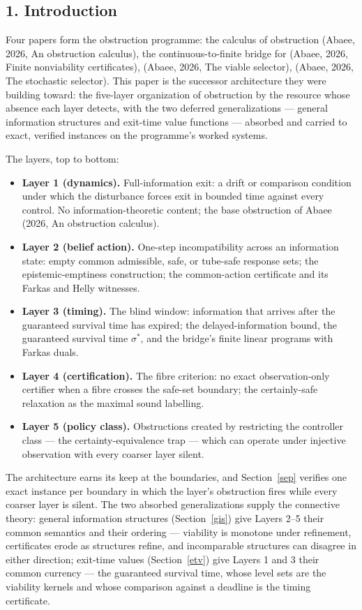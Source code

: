 \documentclass[10pt,twocolumn]{article}
\theoremstyle{definition}
\providecommand{\tightlist}{\setlength{\itemsep}{0pt}\setlength{\parskip}{0pt}}
\begin{document}
\subsection{1. Introduction}\label{introduction}

Four papers form the obstruction programme: the calculus of obstruction
(Abaee, 2026, An obstruction calculus), the continuous-to-finite bridge for
(Abaee, 2026, Finite nonviability certificates), (Abaee, 2026, The viable selector), (Abaee, 2026, The stochastic selector). This paper is
the successor architecture they were building toward: the five-layer
organization of obstruction by the resource whose absence each layer
detects, with the two deferred generalizations --- general information
structures and exit-time value functions --- absorbed and carried to exact,
verified instances on the programme's worked systems.

The layers, top to bottom:
\begin{itemize}\tightlist
\item \textbf{Layer 1 (dynamics).} Full-information exit: a drift or
comparison condition under which the disturbance forces exit in bounded
time against every control. No information-theoretic content; the base
obstruction of Abaee (2026, An obstruction calculus).
\item \textbf{Layer 2 (belief action).} One-step incompatibility across an
information state: empty common admissible, safe, or tube-safe response
sets; the epistemic-emptiness construction; the common-action certificate
and its Farkas and Helly witnesses.
\item \textbf{Layer 3 (timing).} The blind window: information that arrives
after the guaranteed survival time has expired; the delayed-information
bound, the guaranteed survival time \(\sigma^{*}\), and the bridge's finite
linear programs with Farkas duals.
\item \textbf{Layer 4 (certification).} The fibre criterion: no exact
observation-only certifier when a fibre crosses the safe-set boundary; the
certainly-safe relaxation as the maximal sound labelling.
\item \textbf{Layer 5 (policy class).} Obstructions created by restricting
the controller class --- the certainty-equivalence trap --- which can
operate under injective observation with every coarser layer silent.
\end{itemize}

The architecture earns its keep at the boundaries, and Section~\ref{sep}
verifies one exact instance per boundary in which the layer's obstruction
fires while every coarser layer is silent. The two absorbed
generalizations supply the connective theory: general information
structures (Section~\ref{gis}) give Layers 2--5 their common semantics and
their ordering --- viability is monotone under refinement, certificates
erode as structures refine, and incomparable structures can disagree in
either direction; exit-time values (Section~\ref{etv}) give Layers 1 and 3
their common currency --- the guaranteed survival time, whose level sets
are the viability kernels and whose comparison against a deadline is the
timing certificate.
\end{document}
